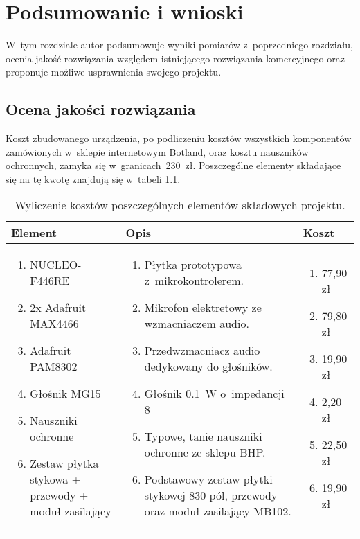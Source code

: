 \chapter{Podsumowanie i wnioski}
\label{cha:wnioski}
W~tym rozdziale autor podsumowuje wyniki pomiarów z~poprzedniego rozdziału, ocenia jakość rozwiązania względem istniejącego rozwiązania komercyjnego oraz proponuje możliwe usprawnienia swojego projektu.
\section{Ocena jakości rozwiązania}
Koszt zbudowanego urządzenia, po podliczeniu kosztów wszystkich komponentów zamówionych w~sklepie internetowym Botland, oraz kosztu nauszników ochronnych, zamyka się w~granicach~230~zł. Poszczególne elementy składające się na tę kwotę znajdują się w~tabeli \ref{tab:costs}.
\begin{table}[h!]
	\centering
	\caption{Wyliczenie kosztów poszczególnych elementów składowych projektu.}
	\label{tab:costs}
		\begin{tabular}{|p{}|p{}|p{}|}
		\toprule Element & Opis & Koszt \\ \midrule
		\begin{enumerate}	
			\item NUCLEO-F446RE
			\item 2x Adafruit MAX4466
			\item Adafruit PAM8302
			\item Głośnik MG15
			\item Nauszniki ochronne
			\item Zestaw płytka stykowa + przewody + moduł zasilający
		\end{enumerate} & 
		\begin{enumerate}	
			\item Płytka prototypowa z~mikrokontrolerem.
			\item Mikrofon elektretowy ze wzmacniaczem audio.
			\item Przedwzmacniacz audio dedykowany do głośników.
			\item Głośnik \SI{0,1}{\W} o~impedancji \SI{8}{\Omega}
			\item Typowe, tanie nauszniki ochronne ze sklepu BHP.
			\item Podstawowy zestaw płytki stykowej 830 pól, przewody oraz moduł zasilający MB102.
		\end{enumerate} &
		\begin{enumerate}
			\item 77,90 zł
			\item 79,80 zł
			\item 19,90 zł
			\item 2,20 zł
			\item 22,50 zł
			\item 19,90 zł
		\end{enumerate}\\ \bottomrule
	\end{tabular}
\end{table}

